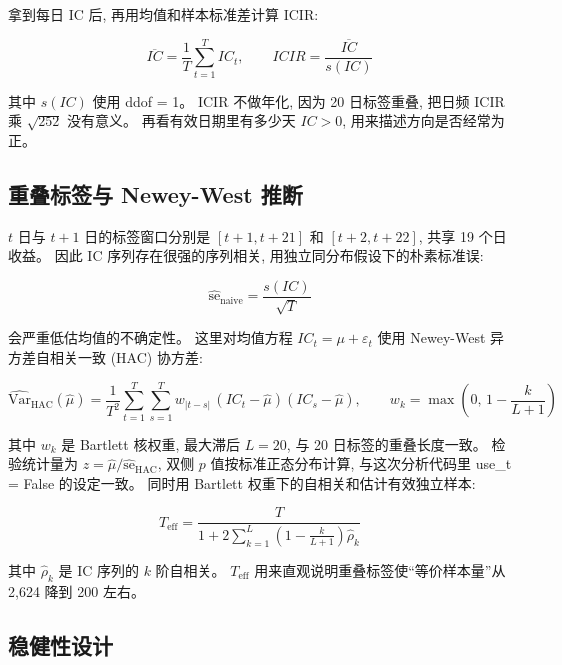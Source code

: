\documentclass[11pt,a4paper]{article}
\begin{document}
拿到每日 IC 后, 再用均值和样本标准差计算 ICIR:

\begin{equation}
\overline{IC}=\frac{1}{T}\sum_{t=1}^{T}IC_t,\qquad
ICIR=\frac{\overline{IC}}{s(IC)}
\label{eq:icir}
\end{equation}

其中 $s(IC)$ 使用 ddof = 1。
ICIR 不做年化, 因为 20 日标签重叠, 把日频 ICIR 乘 $\sqrt{252}$ 没有意义。
再看有效日期里有多少天 $IC>0$, 用来描述方向是否经常为正。

\subsection{重叠标签与 Newey-West 推断}

$t$ 日与 $t+1$ 日的标签窗口分别是 $[t+1,t+21]$ 和 $[t+2,t+22]$, 共享 19 个日收益。
因此 IC 序列存在很强的序列相关, 用独立同分布假设下的朴素标准误:

\begin{equation}
\widehat{\mathrm{se}}_{\mathrm{naive}}=\frac{s(IC)}{\sqrt{T}}
\label{eq:naive}
\end{equation}

会严重低估均值的不确定性。
这里对均值方程 $IC_t=\mu+\varepsilon_t$ 使用 Newey-West 异方差自相关一致 (HAC) 协方差:

\begin{equation}
\widehat{\mathrm{Var}}_{\mathrm{HAC}}(\hat\mu)
=\frac{1}{T^2}\sum_{t=1}^{T}\sum_{s=1}^{T} w_{|t-s|}\,
(IC_t-\hat\mu)(IC_s-\hat\mu),
\qquad
w_k=\max\left(0,\,1-\frac{k}{L+1}\right)
\label{eq:nw}
\end{equation}

其中 $w_k$ 是 Bartlett 核权重, 最大滞后 $L=20$, 与 20 日标签的重叠长度一致。
检验统计量为 $z=\hat\mu/\widehat{\mathrm{se}}_{\mathrm{HAC}}$, 双侧 $p$ 值按标准正态分布计算, 与这次分析代码里 use\_t = False 的设定一致。
同时用 Bartlett 权重下的自相关和估计有效独立样本:

\begin{equation}
T_{\mathrm{eff}}
=\frac{T}{1+2\sum_{k=1}^{L}\left(1-\frac{k}{L+1}\right)\hat\rho_k}
\label{eq:teff}
\end{equation}

其中 $\hat\rho_k$ 是 IC 序列的 $k$ 阶自相关。
$T_{\mathrm{eff}}$ 用来直观说明重叠标签使“等价样本量”从 2{,}624 降到 200 左右。

\subsection{稳健性设计}
\end{document}
